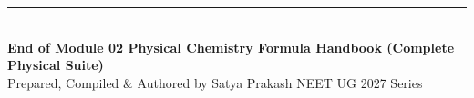 \documentclass[11pt,a4paper]{article}
\begin{document}
\vspace{15pt}
\begin{center}
  \rule{0.6\textwidth}{0.8pt}\\[6pt]
  {\small\textbf{\color{primarydark}End of Module 02 Physical Chemistry Formula Handbook (Complete Physical Suite)}}\\[2pt]
  {\footnotesize\color{accentblue}Prepared, Compiled \& Authored by Satya Prakash \quad\textbar\quad NEET UG 2027 Series}
\end{center}
\end{document}
